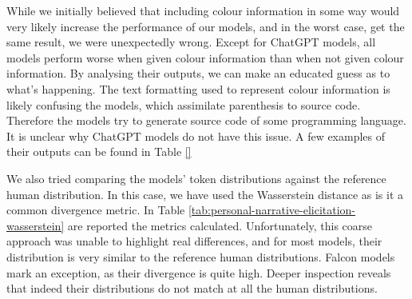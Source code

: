 While we initially believed that including colour information in some way would very likely increase the performance of our models, and in the worst case, get the same result, we were unexpectedly wrong. Except for ChatGPT models, all models perform worse when given colour information than when not given colour information. By analysing their outputs, we can make an educated guess as to what's happening. The text formatting used to represent colour information is likely confusing the models, which assimilate parenthesis to source code. Therefore the models try to generate source code of some programming language. It is unclear why ChatGPT models do not have this issue. A few examples of their outputs can be found in Table \ref{}


We also tried comparing the models' token distributions against the reference human distribution. In this case, we have used the Wasserstein distance \cite{} as is it a common divergence metric. In Table \ref{tab:personal-narrative-elicitation-wasserstein} are reported the metrics calculated. Unfortunately, this coarse approach was unable to highlight real differences, and for most models, their distribution is very similar to the reference human distributions. Falcon models mark an exception, as their divergence is quite high. Deeper inspection reveals that indeed their distributions do not match at all the human distributions. 
